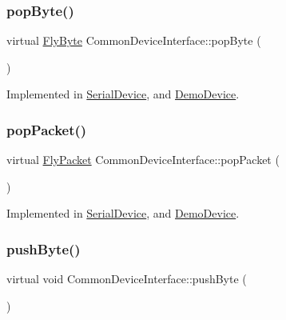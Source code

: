 \subsubsection{\texorpdfstring{pop\+Byte()}{popByte()}}
{\footnotesize\ttfamily virtual \hyperlink{conversions_8h_a1f006e31a957accfe6aa1bf6f401efce}{Fly\+Byte} Common\+Device\+Interface\+::pop\+Byte (\begin{DoxyParamCaption}{ }\end{DoxyParamCaption})\hspace{0.3cm}{\ttfamily [pure virtual]}}



Implemented in \hyperlink{class_serial_device_aa48df17f28ab9f613ba07181487a39c9}{Serial\+Device}, and \hyperlink{class_demo_device_a788dd7e426fab9c8d19ea9fd106260d4}{Demo\+Device}.

\hypertarget{class_common_device_interface_a1b9c96bffa9af46a054e7ce0c341ea19}{}\label{class_common_device_interface_a1b9c96bffa9af46a054e7ce0c341ea19} 
\subsubsection{\texorpdfstring{pop\+Packet()}{popPacket()}}
{\footnotesize\ttfamily virtual \hyperlink{class_fly_packet}{Fly\+Packet} Common\+Device\+Interface\+::pop\+Packet (\begin{DoxyParamCaption}{ }\end{DoxyParamCaption})\hspace{0.3cm}{\ttfamily [pure virtual]}}



Implemented in \hyperlink{class_serial_device_ac581710eb5e03945d9b3de9d39be51fc}{Serial\+Device}, and \hyperlink{class_demo_device_a6e755f50f52301b9166e278fe6851e88}{Demo\+Device}.

\hypertarget{class_common_device_interface_aadb344329a9235fbfa781611b4f769e1}{}\label{class_common_device_interface_aadb344329a9235fbfa781611b4f769e1} 
\subsubsection{\texorpdfstring{push\+Byte()}{pushByte()}}
{\footnotesize\ttfamily virtual void Common\+Device\+Interface\+::push\+Byte (\begin{DoxyParamCaption}\item[{\hyperlink{conversions_8h_a1f006e31a957accfe6aa1bf6f401efce}{Fly\+Byte}}]{ }\end{DoxyParamCaption})\hspace{0.3cm}{\ttfamily [pure virtual]}}



